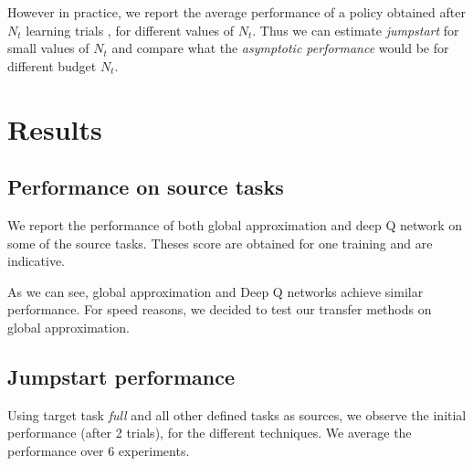 \documentclass{article}
\begin{document}
\noindent However in practice, we report the average performance of a policy obtained after $N_t$ learning trials 
, for different values of $N_t$. Thus we can estimate \textit{jumpstart} for small values of $N_t$ and compare what the \textit{asymptotic performance} would be for different budget $N_t$.

\section{Results}

\subsection{Performance on source tasks}
 We report the performance of both global approximation and deep Q network on some of the source tasks. Theses score are obtained for one training and are indicative.

\begin{table}[!hbt]
\vskip 0.25cm
\caption{Score on tasks for Global Approximation and Q-networks ($ mean (std) $). Bold is best.}
\end{table}

As we can see, global approximation and Deep Q networks achieve similar performance. For speed reasons, we decided to test our transfer methods on global approximation.
 

\subsection{Jumpstart performance}

Using target task \textit{full} and all other defined tasks as sources, we observe the initial performance (after 2 trials), for the different techniques. We average the performance over 6 experiments.
\end{document}
